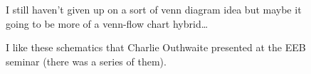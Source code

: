 \documentclass[
]{agujournal2019}
\begin{document}
\begin{figure}


\caption{\label{fig-venn}I still haven't given up on a sort of venn
diagram idea but maybe it going to be more of a venn-flow chart
hybrid\ldots{}}

\end{figure}%

\begin{figure}


\caption{\label{fig-outhwaite}I like these schematics that Charlie
Outhwaite presented at the EEB seminar (there was a series of them).}

\end{figure}%
\end{document}
